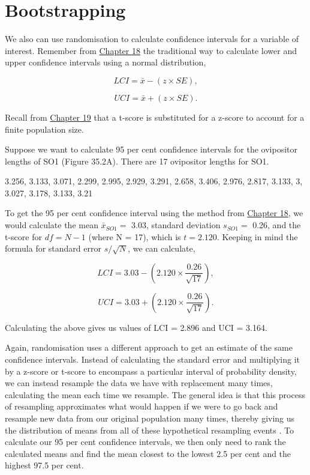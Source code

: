 \documentclass[
  openany]{krantz}
\begin{document}
\hypertarget{bootstrapping}{%
\section{Bootstrapping}\label{bootstrapping}}

We also can use randomisation to calculate confidence intervals for a variable of interest. Remember from \protect\hyperlink{Chapter_18}{Chapter 18} the traditional way to calculate lower and upper confidence intervals using a normal distribution,

\[LCI = \bar{x} - (z \times SE),\]

\[UCI = \bar{x} + (z \times SE).\]

Recall from \protect\hyperlink{Chapter_19}{Chapter 19} that a t-score is substituted for a z-score to account for a finite population size.

Suppose we want to calculate 95 per cent confidence intervals for the ovipositor lengths of SO1 (Figure 35.2A).
There are 17 ovipositor lengths for SO1.

3.256, 3.133, 3.071, 2.299, 2.995, 2.929, 3.291, 2.658, 3.406, 2.976, 2.817, 3.133, 3, 3.027, 3.178, 3.133, 3.21

To get the 95 per cent confidence interval using the method from \protect\hyperlink{Chapter_18}{Chapter 18}, we would calculate the mean \(\bar{x}_{SO1} =\) 3.03, standard deviation \(s_{SO1} =\) 0.26, and the t-score for \(df = N - 1\) (where N = 17), which is \(t = 2.120\).
Keeping in mind the formula for standard error \(s/\sqrt{N}\), we can calculate,

\[LCI = 3.03 - \left(2.120 \times \frac{0.26}{\sqrt{17}}\right),\]

\[UCI = 3.03 + \left(2.120 \times \frac{0.26}{\sqrt{17}}\right).\]

Calculating the above gives us values of LCI = 2.896 and UCI = 3.164.

Again, randomisation uses a different approach to get an estimate of the same confidence intervals.
Instead of calculating the standard error and multiplying it by a z-score or t-score to encompass a particular interval of probability density, we can instead resample the data we have with replacement many times, calculating the mean each time we resample.
The general idea is that this process of resampling approximates what would happen if we were to go back and resample new data from our original population many times, thereby giving us the distribution of means from all of these hypothetical resampling events \citep{Manly2007}.
To calculate our 95 per cent confidence intervals, we then only need to rank the calculated means and find the mean closest to the lowest 2.5 per cent and the highest 97.5 per cent.
\end{document}
